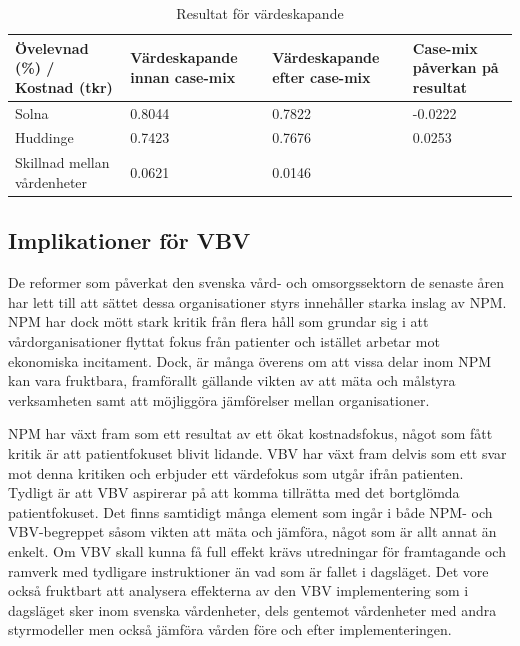 \begin{table}[h]
\centering
\caption{Resultat för värdeskapande}
\label{tab:varderes}
\begin{tabular}{|p{4cm}|p{3cm}|p{2.5cm}|p{3.5cm}|}
\hline
Övelevnad (\%) / Kostnad (tkr)           & Värdeskapande innan case-mix & Värdeskapande efter case-mix & Case-mix påverkan på resultat \\ \hline
Solna                       & 0.8044                       & 0.7822                       & -0.0222                       \\ \hline
Huddinge                    & 0.7423                       & 0.7676                       & 0.0253                        \\ \hline
Skillnad mellan \linebreak vårdenheter & 0.0621                       & 0.0146                       &                               \\ \hline
\end{tabular}
\end{table}

\subsection{Implikationer för VBV}

De reformer som påverkat den svenska vård- och omsorgssektorn de senaste åren har lett till att sättet dessa organisationer styrs innehåller starka inslag av NPM. NPM har dock mött stark kritik från flera håll som grundar sig i att vårdorganisationer flyttat fokus från patienter och istället arbetar mot ekonomiska incitament. Dock, är många överens om att vissa delar inom NPM kan vara fruktbara, framförallt gällande vikten av att mäta och målstyra verksamheten samt att möjliggöra jämförelser mellan organisationer.

NPM har växt fram som ett resultat av ett ökat kostnadsfokus, något som fått kritik är att patientfokuset blivit lidande. VBV har växt fram delvis som ett svar mot denna kritiken och erbjuder ett värdefokus som utgår ifrån patienten. Tydligt är att VBV aspirerar på att komma tillrätta med det bortglömda patientfokuset. Det finns samtidigt många element som ingår i både NPM- och VBV-begreppet såsom vikten att mäta och jämföra, något som är allt annat än enkelt. Om VBV skall kunna få full effekt krävs utredningar för framtagande och ramverk med tydligare instruktioner än vad som är fallet i dagsläget. Det vore också fruktbart att analysera effekterna av den VBV implementering som i dagsläget sker inom svenska vårdenheter, dels gentemot vårdenheter med andra styrmodeller men också jämföra vården före och efter implementeringen.

